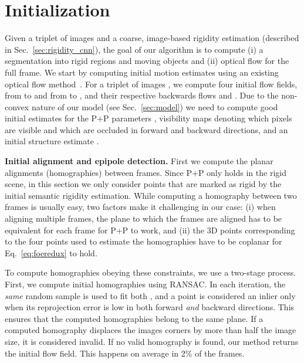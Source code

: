 \documentclass[10pt,twocolumn,letterpaper]{article}
\begin{document}
 \section{Initialization}
\label{sec:initialization_alignment}
\noindent
Given a triplet of images
and a coarse, image-based rigidity estimation (described in Sec.~\ref{sec:rigidity_cnn}), the goal of our algorithm is to compute (i) a segmentation into rigid regions and moving objects and (ii) optical flow for the full frame.
We start by computing initial motion estimates using an existing optical flow method~\cite{Menze2015GCPR}.
For a triplet of images , we compute four initial flow fields,  from  to  and  from  to , and their respective backwards flows  and . 
Due to the non-convex nature of our model (see Sec.~\ref{sec:model}) we need to compute good initial estimates for the P+P parameters , visibility maps  denoting which pixels are visible and which are occluded in forward and backward directions, and an initial structure estimate .

{\bf Initial alignment and epipole detection.}
\noindent
First we compute the planar alignments (homographies) between frames.
Since P+P only holds in the rigid scene, in this section we only consider points that are marked as rigid by the initial semantic rigidity estimation.
While computing a homography between two frames is usually easy, two factors make it challenging in our case: (i) when aligning multiple frames, the plane to which the frames are aligned has to be equivalent for each frame for P+P to work, and (ii) the 3D points corresponding to the four points used to estimate the homographies have to be coplanar for Eq.~\eqref{eq:foeredux} to hold.


To compute homographies obeying these constraints, we use a two-stage process.
First, we compute initial homographies  using RANSAC.
In each iteration, the \textit{same} random sample is used to fit both , and a point is considered an inlier only when its reprojection error is low in both forward \textit{and} backward directions.
This ensures that the computed homographies belong to the same plane.
If a computed homography displaces the images corners by more than half the image size, it is considered invalid.
If no valid homography is found, our method returns the initial flow field. This happens on average in 2\% of the frames.
\end{document}
